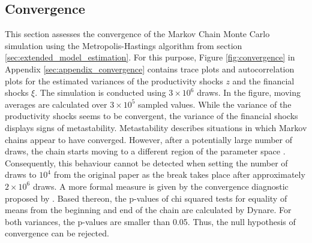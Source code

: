 

\subsection{Convergence}
\label{sec:convergence}

This section assesses the convergence of the Markov Chain Monte Carlo simulation using the Metropolis-Hastings algorithm from section \ref{sec:extended_model_estimation}. For this purpose, Figure \ref{fig:convergence} in Appendix \ref{sec:appendix_convergence} contains trace plots and autocorrelation plots for the estimated variances of the productivity shocks $z$ and the financial shocks $\xi$. The simulation is conducted using $3\times10^{6}$ draws. In the figure, moving averages are calculated over $3\times10^{5}$ sampled values. While the variance of the productivity shocks seems to be convergent, the variance of the financial shocks displays signs of metastability. Metastability describes situations in which Markov chains appear to have converged. However, after a potentially large number of draws, the chain starts moving to a different region of the parameter space \citep{PATILpymc}. Consequently, this behaviour cannot be detected when setting the number of draws to $10^{4}$ from the original paper as the break takes place after approximately $2\times10^{6}$ draws. A more formal measure is given by the convergence diagnostic proposed by \cite{GEWEKEevaluating}. Based thereon, the p-values of chi squared tests for equality of means from the beginning and end of the chain are calculated by Dynare. For both variances, the p-values are smaller than 0.05. Thus, the null hypothesis of convergence can be rejected.
